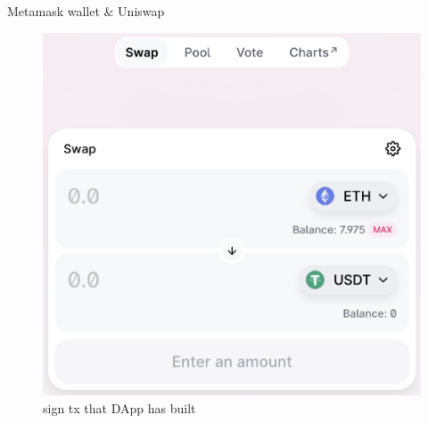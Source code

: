\begin{frame}[fragile]{Metamask wallet \& Uniswap}
\begin{minipage}{.49\linewidth}
\begin{figure}
  \includegraphics[scale=0.3]{uniswap_swap.png}
  \caption*{sign tx that DApp has built}
  \end{figure}
  \end{minipage}
\end{frame}